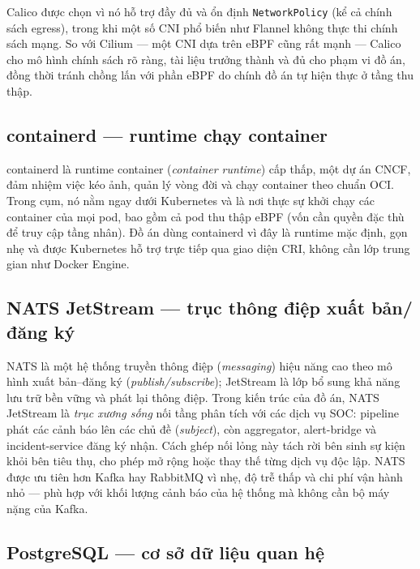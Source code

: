 Calico được chọn vì nó hỗ trợ đầy đủ và ổn định \texttt{NetworkPolicy} (kể cả chính sách
egress), trong khi một số CNI phổ biến như Flannel không thực thi chính sách mạng. So với
Cilium --- một CNI dựa trên eBPF cũng rất mạnh --- Calico cho mô hình chính sách rõ ràng,
tài liệu trưởng thành và đủ cho phạm vi đồ án, đồng thời tránh chồng lấn với phần eBPF do
chính đồ án tự hiện thực ở tầng thu thập.

\subsection{containerd --- runtime chạy container}

containerd là runtime container (\textit{container runtime}) cấp thấp, một dự án CNCF,
đảm nhiệm việc kéo ảnh, quản lý vòng đời và chạy container theo chuẩn OCI. Trong cụm, nó
nằm ngay dưới Kubernetes và là nơi thực sự khởi chạy các container của mọi pod, bao gồm
cả pod thu thập eBPF (vốn cần quyền đặc thù để truy cập tầng nhân). Đồ án dùng containerd
vì đây là runtime mặc định, gọn nhẹ và được Kubernetes hỗ trợ trực tiếp qua giao diện CRI,
không cần lớp trung gian như Docker Engine.

\subsection{NATS JetStream --- trục thông điệp xuất bản/đăng ký}

NATS là một hệ thống truyền thông điệp (\textit{messaging}) hiệu năng cao theo mô hình
xuất bản--đăng ký (\textit{publish/subscribe}); JetStream là lớp bổ sung khả năng lưu trữ
bền vững và phát lại thông điệp. Trong kiến trúc của đồ án, NATS JetStream là \emph{trục
xương sống} nối tầng phân tích với các dịch vụ SOC: pipeline phát các cảnh báo lên các chủ
đề (\textit{subject}), còn aggregator, alert-bridge và incident-service đăng ký nhận. Cách
ghép nối lỏng này tách rời bên sinh sự kiện khỏi bên tiêu thụ, cho phép mở rộng hoặc thay
thế từng dịch vụ độc lập. NATS được ưu tiên hơn Kafka hay RabbitMQ vì nhẹ, độ trễ thấp và
chi phí vận hành nhỏ --- phù hợp với khối lượng cảnh báo của hệ thống mà không cần bộ máy
nặng của Kafka.

\subsection{PostgreSQL --- cơ sở dữ liệu quan hệ}

